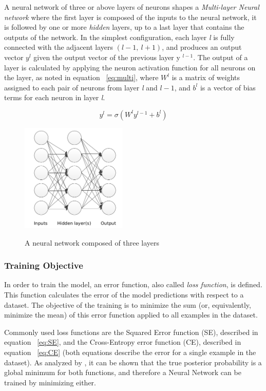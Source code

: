 A neural network of three or above layers of neurons shapes a \textit{Multi-layer Neural network} where the first layer is composed of the inputs to the neural network, it is followed by one or more \textit{hidden} layers, up to a last layer that contains the outputs of the network. In the simplest configuration, each layer \textit{l} is fully connected with the adjacent layers $(l - 1 ,~ l + 1)$, and produces an output vector $y^{l}$ given the output vector of the previous layer y $^{l-1}$. The output of a layer is calculated by applying the neuron activation function for all neurons on the layer, as noted in equation ~\ref{eq:multi}, where $W^{l}$ is a matrix of weights assigned to each pair of neurons from layer \textit{l} and $l - 1$, and $b^{l}$ is a vector of bias terms for each neuron in layer \textit{l}.

\begin{equation}
y^{l} = \sigma(W^{l}y^{l-1}+ b^{l}) 
\label{eq:multi}
\end{equation}


\begin{figure}[H]
	\centering
	{\includegraphics[width=0.45\textwidth]{images/mann}}
	\caption{A neural network composed of three layers}
	\label{fig:multi}
\end{figure}

\subsubsection{Training Objective} 
In order to train the model, an error function, also called \textit{loss function}, is defined. This function calculates the error of the model predictions with respect to a dataset. The objective of the training is to minimize the sum (or, equivalently, minimize the mean) of this error function applied to all examples in the dataset. 

\indent Commonly used loss functions are the Squared Error function (SE), described in equation ~\ref{eq:SE}, and the Cross-Entropy error function (CE), described in equation ~\ref{eq:CE} (both equations describe the error for a single example in the dataset). As analyzed by \citet{golik2013cross}, it can be shown that the true posterior probability is a global minimum for both functions, and therefore a Neural Network can be trained by minimizing either. 

